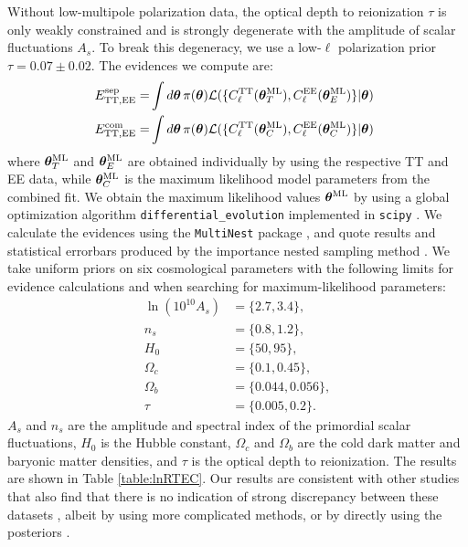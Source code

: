\documentclass[amsmath, prl, reprint, aps]{revtex4-1}
\newcommand{\tv}{\bm{\theta}}
\newcommand{\tML}{\tv^{\rm ML}}
\newcommand{\dragan}[1]{\textcolor{red}{(DH: #1)}}
\begin{document}
    Without low-multipole polarization data, the optical depth to reionization $\tau$ is only weakly constrained and is strongly degenerate with the amplitude of scalar fluctuations $A_s$. To break this degeneracy, we use a low-$\ell$ polarization prior $\tau = 0.07\pm0.02$. The evidences we compute are:
    \begin{equation}
    \begin{aligned}
    \!\!\!
    E^{\rm sep}_{\rm TT, EE} =& \int d\tv\, \pi(\tv)  
    \mathcal{L}(\{C_\ell^{\rm TT}(\tML_T), C_\ell^{\rm EE}(\tML_E)\}|\tv)  \\
    \!\!\!
    {E}^{\rm com}_{\rm TT, EE} =& \int d\tv\, \pi(\tv)  
    \mathcal{L}(\{C_\ell^{\rm TT}(\tML_C), C_\ell^{\rm EE}(\tML_C)\}|\tv)
    \end{aligned}
    \end{equation}
    where $\tML_T$ and $\tML_E$ are obtained individually by using the respective TT and EE data, while $\tML_C$ is the maximum likelihood model parameters from the combined fit. We obtain the maximum likelihood values $\tML$ by using a global optimization algorithm {\tt differential\_evolution} \cite{Storn1997} implemented in {\tt scipy} \cite{scipy}. We calculate the evidences using the \texttt{MultiNest} package \cite{Feroz:2007kg, Feroz:2008xx}, and quote results and statistical errorbars produced by the importance nested sampling method \cite{Feroz:2013hea}. We take uniform priors on six cosmological parameters with the following limits for evidence calculations and when searching for maximum-likelihood parameters: \begin{align}\ln (10^{10} A_s) &= \{2.7, 3.4\}, \nonumber \\ n_s &= \{0.8, 1.2\}, \nonumber \\ H_0 &=\{50, 95\}, \nonumber \\ \Omega_c &=\{0.1, 0.45\}, \nonumber \\ \Omega_b &= \{0.044, 0.056\}, \nonumber \\ \tau &=\{0.005, 0.2\}. \nonumber \end{align} 
    {$A_s$ and $n_s$ are the amplitude and spectral index of the primordial scalar fluctuations, $H_0$ is the Hubble constant, $\Omega_c$ and $\Omega_b$ are the cold dark matter and baryonic matter densities, and $\tau$ is the optical depth to reionization.} The results are shown in Table \ref{table:lnRTEC}.  Our results are consistent with other studies that also find that there is no indication of strong discrepancy between these datasets \cite{Shafieloo:2016zga}, albeit by using more complicated methods, or by directly using the posteriors \cite{Lin:2017bhs}.
    
\end{document}
